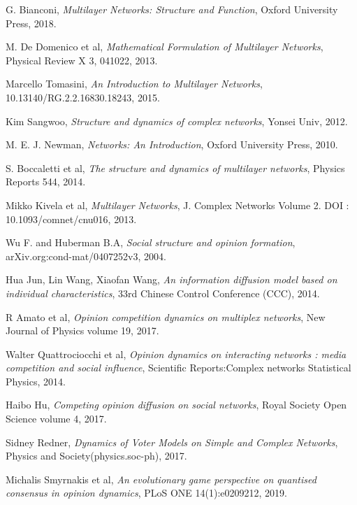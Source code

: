 \documentclass[english]{cccconf}
\begin{document}
\begin{thebibliography}{0}
G. Bianconi, \textit{Multilayer Networks: Structure and Function}, Oxford University Press, 2018.

M. De Domenico et al, \textit{Mathematical Formulation of Multilayer Networks}, Physical Review X 3, 041022, 2013.

Marcello Tomasini, \textit{An Introduction to Multilayer Networks}, 10.13140/RG.2.2.16830.18243, 2015.

Kim Sangwoo, \textit{Structure and dynamics of complex networks}, Yonsei Univ, 2012.

M. E. J. Newman, \textit{Networks: An Introduction}, Oxford University Press, 2010.
	
S. Boccaletti et al, \textit{The structure and dynamics of multilayer networks}, Physics Reports 544, 2014.	

Mikko Kivela et al, \textit{Multilayer Networks}, J. Complex Networks Volume 2. DOI : 10.1093/comnet/cnu016, 2013.	

Wu F. and Huberman B.A, \textit{Social structure and opinion formation}, arXiv.org:cond-mat/0407252v3, 2004.	

Hua Jun, Lin Wang, Xiaofan Wang, \textit{An information diffusion model based on individual characteristics}, 33rd Chinese Control Conference (CCC), 2014.

R Amato et al, \textit{Opinion competition dynamics on multiplex networks}, New Journal of Physics volume 19, 2017.

Walter Quattrociocchi et al, \textit{Opinion dynamics on interacting networks : media competition and social influence}, Scientific Reports:Complex networks Statistical Physics, 2014.

Haibo Hu, \textit{Competing opinion diffusion on social networks}, Royal Society Open Science volume 4, 2017.

Sidney Redner, \textit{Dynamics of Voter Models on Simple and Complex Networks}, Physics and Society(physics.soc-ph), 2017.

Michalis Smyrnakis et al, \textit{An evolutionary game perspective on quantised consensus in opinion dynamics}, PLoS ONE 14(1):e0209212, 2019.


\end{thebibliography}
\end{document}
